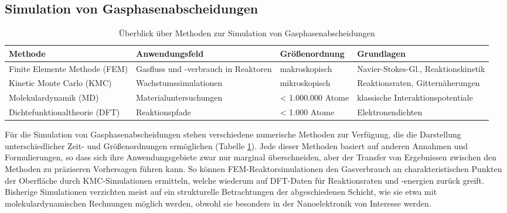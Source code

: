 \subsection{Simulation von Gasphasenabscheidungen}

\begin{table}
  \oddrowcolors
  \caption[Überblick über Methoden zur Simulation von Gasphasenabscheidungen]{Überblick über Methoden zur Simulation von Gasphasenabscheidungen}
  \label{tab:deposition-simulations}
  \begin{tabularx}{\textwidth}{|XXlX|}
    \hline
    Methode                           & Anwendungsfeld                       & Größenordnung     & Grundlagen                          \\
    \hline
    Finite Elemente Methode (FEM)     & Gasfluss und -verbrauch in Reaktoren & makroskopisch     & Navier-Stokes-Gl., Reaktionskinetik \\
    Kinetic Monte Carlo (KMC)         & Wachstums\-simulationen              & mikroskopisch     & Reaktionsraten, Gitternäherungen    \\
    Molekular\-dynamik (MD)           & Material\-unter\-suchungen           & < 1.000.000 Atome & klassische Interaktionspotentiale   \\
    Dichte\-funktional\-theorie (DFT) & Reaktionspfade                       & < 1.000 Atome     & Elektronendichten                   \\
    \hline
  \end{tabularx}
\end{table}


Für die Simulation von Gasphasenabscheidungen stehen verschiedene numerische Methoden zur Verfügung, die die Darstellung unterschiedlicher Zeit- und Größenordnungen ermöglichen (Tabelle \ref{tab:deposition-simulations}).
Jede dieser Methoden basiert auf anderen Annahmen und Formulierungen, so dass sich ihre Anwendungsgebiete zwar nur marginal überschneiden, aber der Transfer von Ergebnissen zwischen den Methoden zu präziseren Vorhersagen führen kann.
So können FEM-Reaktorsimulationen den Gasverbrauch an charakteristischen Punkten der Oberfläche durch KMC-Simulationen ermitteln, welche wiederum auf DFT-Daten für Reaktionsraten und -energien zurück greift.
Bisherige Simulationen verzichten meist auf ein strukturelle Betrachtungen der abgeschiedenen Schicht, wie sie etwa mit molekulardynamischen Rechnungen möglich werden, obwohl sie besonders in der Nanoelektronik von Interesse werden.
